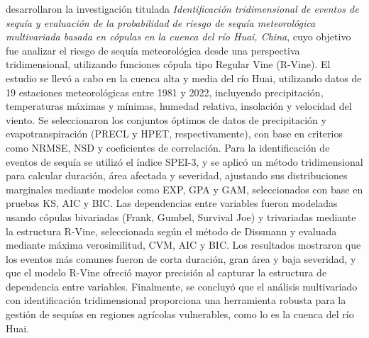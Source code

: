 \textcite{Shao2025} desarrollaron la investigación titulada \emph{Identificación tridimensional de eventos de sequía y evaluación de la probabilidad de riesgo de sequía meteorológica multivariada basada en cópulas en la cuenca del río Huai, China}, cuyo objetivo fue analizar el riesgo de sequía meteorológica desde una perspectiva tridimensional, utilizando funciones cópula tipo Regular Vine (R-Vine). El estudio se llevó a cabo en la cuenca alta y media del río Huai, utilizando datos de 19 estaciones meteorológicas entre 1981 y 2022, incluyendo precipitación, temperaturas máximas y mínimas, humedad relativa, insolación y velocidad del viento. Se seleccionaron los conjuntos óptimos de datos de precipitación y evapotranspiración (PRECL y HPET, respectivamente), con base en criterios como NRMSE, NSD y coeficientes de correlación. Para la identificación de eventos de sequía se utilizó el índice SPEI-3, y se aplicó un método tridimensional para calcular duración, área afectada y severidad, ajustando sus distribuciones marginales mediante modelos como EXP, GPA y GAM, seleccionados con base en pruebas KS, AIC y BIC. Las dependencias entre variables fueron modeladas usando cópulas bivariadas (Frank, Gumbel, Survival Joe) y trivariadas mediante la estructura R-Vine, seleccionada según el método de Dissmann y evaluada mediante máxima verosimilitud, CVM, AIC y BIC. Los resultados mostraron que los eventos más comunes fueron de corta duración, gran área y baja severidad, y que el modelo R-Vine ofreció mayor precisión al capturar la estructura de dependencia entre variables. Finalmente, se concluyó que el análisis multivariado con identificación tridimensional proporciona una herramienta robusta para la gestión de sequías en regiones agrícolas vulnerables, como lo es la cuenca del río Huai.

